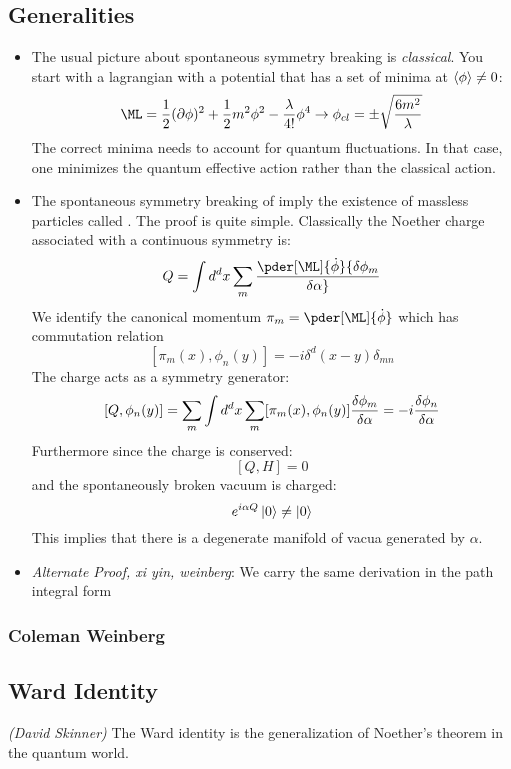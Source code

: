\documentclass[11pt]{scrartcl}
\begin{document}
\subsection{Generalities}
\begin{itemize}
	\item The usual picture about spontaneous symmetry breaking is \emph{classical}.  You start with a lagrangian with a potential that has a set of minima at $\braket{\phi} \neq 0$:
	\[\ML = {1 \over 2} (\partial \phi)^2 + \frac12 m^2 \phi^2- {\lambda \over 4!} \phi^4 \rightarrow \phi_{cl} = \pm  \sqrt{6m^2 \over \lambda} \]
	The correct minima needs to account for quantum fluctuations.  In that case, one minimizes the quantum effective action rather than the classical action.
	
	\item The spontaneous symmetry breaking of  imply the existence of massless particles called .  The proof is quite simple.
	Classically the Noether charge associated with a continuous symmetry is:
	\[Q = \int d^d x \sum_m  \pder[\ML]{\dot{\phi}} {\delta \phi_m \over \delta \alpha} \]
	We identify the canonical momentum $ \pi_m = \pder[\ML]{\dot{\phi}}$ which has commutation relation
	\[ [\pi_m(x), \phi_n(y)] = -i \delta^d (x-y) \delta_{mn} \]
	The charge acts as a symmetry generator:
	\[ [Q, \phi_n(y)]  = \sum_m \int d^d x \sum_m [\pi_m(x), \phi_n(y)] {\delta \phi_m \over \delta \alpha}  = - i {\delta \phi_n \over \delta \alpha} \]
	Furthermore since the charge is conserved:
	\[ [Q, H] = 0 \]
	and the spontaneously broken vacuum is charged: 
	\[ e^{i \alpha Q} \ket{0} \neq \ket{0} \]
	This implies that there is a degenerate manifold of vacua generated by $\alpha$.
	
	\item \emph{Alternate Proof, xi yin, weinberg}:  We carry the same derivation in the path integral form
	\end{itemize}

\subsubsection{Coleman Weinberg}

\subsection{Ward Identity}
\emph{(David Skinner) }
The Ward identity is the generalization of Noether's theorem in the quantum world.
\end{document}
